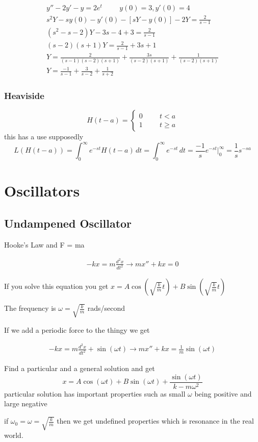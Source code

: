 \documentclass[fleqn]{report}
\newcommand{\hp}{\hspace{1cm}}
\newcommand{\equations} [1] {
\begin{gather*}
#1
\end{gather*}
}
\begin{document}
\equations{
y'' - 2y' - y = 2e^{t}
\hp
y(0) = 3, y'(0) = 4
\\
s^2Y - s y(0) - y'(0) - [sY - y(0) ] - 2Y = \frac{2}{s - 1}
\\
(s^2 - s - 2)Y - 3s - 4 + 3 = \frac{2}{s - 1}
\\
(s - 2)(s + 1)Y = \frac{2}{s - 1} + 3s + 1
\\
Y = \frac{2}{(s - 1)(s - 2)(s + 1)} + \frac{3s}{(s - 2)(s + 1)} + \frac{1}{(s - 2)(s + 1)}
\\
Y = \frac{-1}{s - 1} + \frac{3}{s -2 } + \frac{1}{s + 2}
}
 
 
\subsection{Heaviside}
\[
H(t - a) =
\begin{cases}
0 \hp t < a 
\\
1 \hp t \geq a 
\end{cases}
\]
this has a use supposedly
\[
L (H(t - a)) = \int^\infty_0 e^{-st} H(t - a) \, dt = 
\int^\infty_0 e^{-st} \, dt = \frac{-1}{s} e^{-st} \Big|^\infty_0 = \frac{1}{s} s^{-sa}
\]
 
 
 \chapter{Oscillators}
 
 \section{Undampened Oscillator}
 Hooke's Law and F  = ma
 \equations{
 -kx = m \frac{d^2 x}{dt^2}
 \longrightarrow
m x'' + kx = 0
 }
 If you solve this equation you get $x = A \cos \left( \sqrt{ \frac{ k}{m}} t \right) +  B \sin \left( \sqrt{ \frac{ k}{m}} t \right)$
 
 The frequency is $\omega = \sqrt{ \frac{k}{m}}$ rads/second
 
 If we add a periodic force to the thingy we get
 \equations{
  -kx = m \frac{d^2 x}{dt^2} + \sin (\omega t)
 \longrightarrow
m x'' + kx = \frac{1}{m} \sin ( \omega t)
 }
 Find a particular and a general solution and get
 \[
 x = A \cos (\omega t) + B \sin (\omega t) + \frac{\sin (\omega t)}{k - m \omega^2 }
 \]
 particular solution has important properties such as small $\omega$ being positive and large negative 
 
 if $\omega_0 = \omega = \sqrt{ \frac{k}{m}}$ then we get undefined properties which is resonance in the real world.
 
\end{document}
